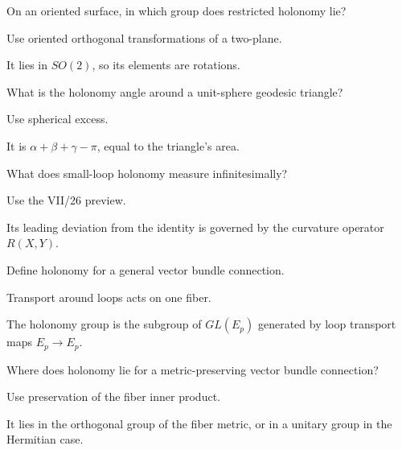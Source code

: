 \begin{exercise}\label{exr:vii25-14}
On an oriented surface, in which group does restricted holonomy lie?
\end{exercise}
\begin{hint}
Use oriented orthogonal transformations of a two-plane.
\end{hint}
\begin{solution}
It lies in \(SO(2)\), so its elements are rotations.
\end{solution}


\begin{exercise}\label{exr:vii25-15}
What is the holonomy angle around a unit-sphere geodesic triangle?
\end{exercise}
\begin{hint}
Use spherical excess.
\end{hint}
\begin{solution}
It is \(\alpha+\beta+\gamma-\pi\), equal to the triangle's area.
\end{solution}


\begin{exercise}\label{exr:vii25-16}
What does small-loop holonomy measure infinitesimally?
\end{exercise}
\begin{hint}
Use the VII/26 preview.
\end{hint}
\begin{solution}
Its leading deviation from the identity is governed by the curvature operator \(R(X,Y)\).
\end{solution}


\begin{exercise}\label{exr:vii25-17}
Define holonomy for a general vector bundle connection.
\end{exercise}
\begin{hint}
Transport around loops acts on one fiber.
\end{hint}
\begin{solution}
The holonomy group is the subgroup of \(GL(E_p)\) generated by loop transport maps \(E_p\to E_p\).
\end{solution}


\begin{exercise}\label{exr:vii25-18}
Where does holonomy lie for a metric-preserving vector bundle connection?
\end{exercise}
\begin{hint}
Use preservation of the fiber inner product.
\end{hint}
\begin{solution}
It lies in the orthogonal group of the fiber metric, or in a unitary group in the Hermitian case.
\end{solution}


